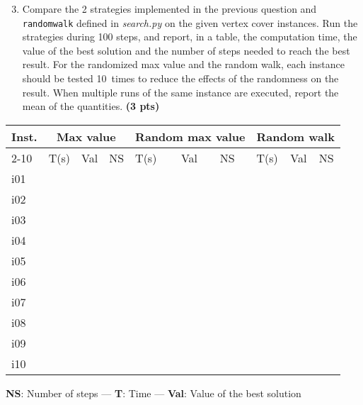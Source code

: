 \documentclass[11pt,a4paper]{report}
\begin{document}
\begin{answers}[2.5 cm]
\end{answers}



\begin{enumerate}
\setcounter{enumi}{2}
\item Compare the 2 strategies implemented in the previous question and \texttt{randomwalk} defined in \textit{search.py} on the given vertex cover instances. 
    Run the strategies during 100 steps, and report, in a table, the computation
    time, the value of the best solution and the number of steps needed to reach the best result. For the
    randomized max value and the random walk, each instance should be tested 10~times to reduce
    the effects of the randomness on the result. When multiple runs of the same instance
    are executed, report the mean of the quantities. \textbf{(3 pts)}
\end{enumerate}

\begin{answers}[7cm]
\begin{center}
\begin{tabular}{||l||l|l|l||l|l|l||l|l|l||}
\hline
\multirow{3}{*}{Inst.} & \multicolumn{3}{c||}{Max value} & \multicolumn{3}{c||}{Random max value} & \multicolumn{3}{c||}{Random walk} \\
\cline{2-10}
\cline{2-10}
 & T(s) & Val & NS & T(s) & Val & NS & T(s) & Val & NS\\
\hline
i01 & & & & & & & & &\\
\hline
i02 & & & & & & & & &\\
\hline
i03 & & & & & & & & &\\
\hline
i04 & & & & & & & & &\\
\hline
i05 & & & & & & & & &\\
\hline
i06 & & & & & & & & &\\
\hline
i07 & & & & & & & & &\\
\hline
i08 & & & & & & & & &\\
\hline
i09 & & & & & & & & &\\
\hline
i10 & & & & & & & & &\\
\hline
\end{tabular}
\end{center}
\textbf{NS}: Number of steps — \textbf{T}: Time — \textbf{Val}: Value of the best solution
\end{answers}
\end{document}
